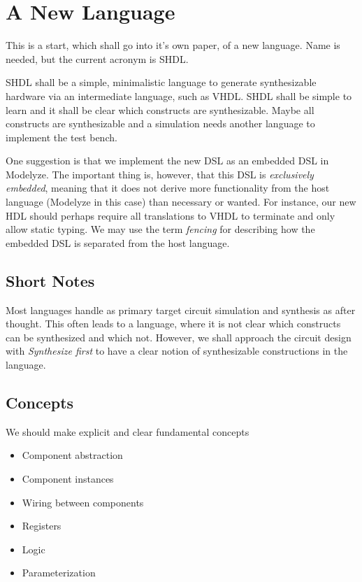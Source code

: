 
\section{A New Language}

This is a start, which shall go into it's own paper, of a new language.
Name is needed, but the current acronym is SHDL.

SHDL shall be a simple, minimalistic language to generate synthesizable
hardware via an intermediate language, such as VHDL. SHDL shall
be simple to learn and it shall be clear which constructs are synthesizable.
Maybe all constructs are synthesizable and a simulation needs another
language to implement the test bench.

One suggestion is that we implement the new DSL as an embedded DSL in
Modelyze. The important thing is, however, that this DSL is
\emph{exclusively embedded}, meaning that it does not derive more
functionality from the host language (Modelyze in this case) than
necessary or wanted. For instance, our new HDL should perhaps require
all translations to VHDL to terminate and only allow static
typing. We may use the term \emph{fencing} for describing
how the embedded DSL is separated from the host language.


\subsection{Short Notes}


Most languages handle as primary target circuit simulation and
synthesis as after thought. This often leads to a language, where it
is not clear which constructs can be synthesized and which not.
However, we shall approach the circuit
design with \emph{Synthesize first} to have a clear notion of synthesizable
constructions in the language.


\subsection{Concepts}
We should make explicit and clear fundamental concepts

\begin{itemize}
\item Component abstraction
\item Component instances
\item Wiring between components
\item Registers
\item Logic
\item Parameterization
\end{itemize}


